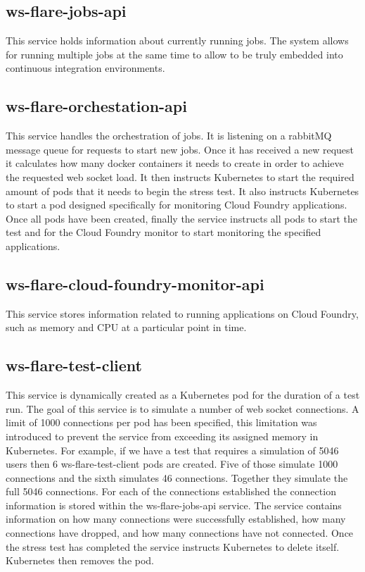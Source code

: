 \subsection{ws-flare-jobs-api}

This service holds information about currently running jobs. The system allows for running multiple jobs at the same time to allow to be truly embedded into continuous integration environments.

\subsection{ws-flare-orchestation-api}

This service handles the orchestration of jobs. It is listening on a rabbitMQ message queue for requests to start new jobs. Once it has received a new request it calculates how many docker containers it needs to create in order to achieve the requested web socket load. It then instructs Kubernetes to start the required amount of pods that it needs to begin the stress test. It also instructs Kubernetes to start a pod designed specifically for monitoring Cloud Foundry applications. Once all pods have been created, finally the service instructs all pods to start the test and for the Cloud Foundry monitor to start monitoring the specified applications.

\subsection{ws-flare-cloud-foundry-monitor-api}

This service stores information related to running applications on Cloud Foundry, such as memory and CPU at a particular point in time. 

\subsection{ws-flare-test-client}

This service is dynamically created as a Kubernetes pod for the duration of a test run. The goal of this service is to simulate a number of web socket connections. A limit of 1000 connections per pod has been specified, this limitation was introduced to prevent the service from exceeding its assigned memory in Kubernetes. For example, if we have a test that requires a simulation of 5046 users then 6 ws-flare-test-client pods are created. Five of those simulate 1000 connections and the sixth simulates 46 connections. Together they simulate the full 5046 connections. For each of the connections established the connection information is stored within the ws-flare-jobs-api service. The service contains information on how many connections were successfully established, how many connections have dropped, and how many connections have not connected. Once the stress test has completed the service instructs Kubernetes to delete itself. Kubernetes then removes the pod.

